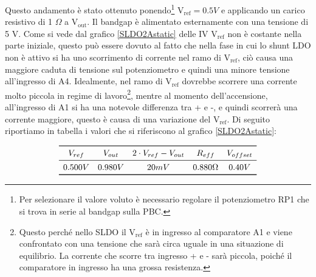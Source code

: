 Questo andamento è stato ottenuto ponendo\footnote{Per selezionare il valore voluto è necessario regolare il potenziometro RP1 che si trova in serie al bandgap sulla PBC.} $\mathrm{V_{ref} = 0.5} V$ e applicando un carico resistivo di 1 $\Omega$ a $\mathrm{V_{out}}$. Il bandgap è alimentato esternamente con una tensione di 5 V. 
Come si vede dal grafico \ref{SLDO2Astatic} delle IV $\mathrm{V_{ref}}$ non è costante nella parte iniziale, questo può essere dovuto al fatto che nella fase in cui lo shunt LDO non è attivo si ha uno scorrimento di corrente nel ramo di $\mathrm{V_{ref}}$, ciò causa una maggiore caduta di tensione sul potenziometro e quindi una minore tensione all'ingresso di A4. 
Idealmente, nel ramo di $\mathrm{V_{ref}}$ dovrebbe scorrere una corrente molto piccola in regime di lavoro\footnote{Questo perché nello SLDO il $\mathrm{V_{ref}}$ è in ingresso al comparatore A1 e viene confrontato con una tensione che sarà circa uguale in una situazione di equilibrio. La corrente che scorre tra ingresso + e - sarà piccola, poiché il comparatore in ingresso ha una grossa resistenza.}, mentre al momento dell'accensione, all'ingresso di A1 si ha una notevole differenza tra + e -, e quindi scorrerà una corrente maggiore, questo è causa di una variazione del $\mathrm{V_{ref}}$. Di seguito riportiamo in tabella i valori che si riferiscono al grafico \ref{SLDO2Astatic}: 

\[
\begin{array}{ccccc}

\toprule
V_{ref} & V_{out} & 2 \cdot V_{ref}- V_{out} & R_{eff} & V_{offset} \\

\midrule

0.500 V & 0.980 V & 20 mV & 0.880 \Omega & 0.40 V \\

\bottomrule
\end{array}
\]


